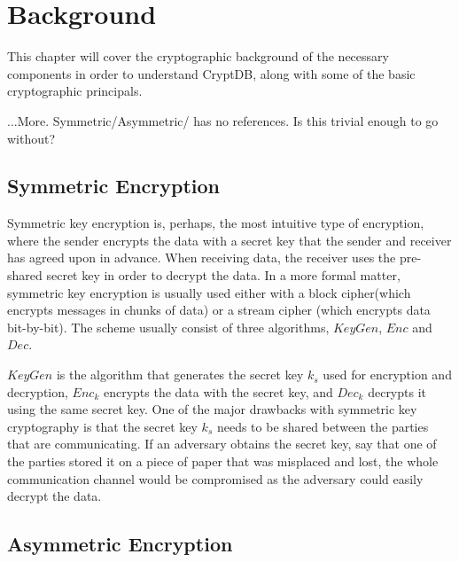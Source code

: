 \chapter{Background}
\label{chp:background}

This chapter will cover the cryptographic background of the necessary components in order to understand CryptDB, along with some of the basic cryptographic principals.

...More. Symmetric/Asymmetric/ has no references. Is this trivial enough to go without?

\section{Symmetric Encryption}

Symmetric key encryption is, perhaps, the most intuitive type of encryption, where the sender encrypts the data with a secret key that the sender and receiver has agreed upon in advance. When receiving data, the receiver uses the pre-shared secret key in order to decrypt the data. In a more formal matter, symmetric key encryption is usually used either with a block cipher(which encrypts messages in chunks of data) or a stream cipher (which encrypts data bit-by-bit). The scheme usually consist of three algorithms, $KeyGen$, $Enc$ and $Dec$.

$KeyGen$ is the algorithm that generates the secret key $k_s$ used for encryption and decryption, $Enc_k$ encrypts the data with the secret key, and $Dec_k$ decrypts it using the same secret key. One of the major drawbacks with symmetric key cryptography is that the secret key $k_s$ needs to be shared between the parties that are communicating. If an adversary obtains the secret key, say that one of the parties stored it on a piece of paper that was misplaced and lost, the whole communication channel would be compromised as the adversary could easily decrypt the data.



\section{Asymmetric Encryption}

